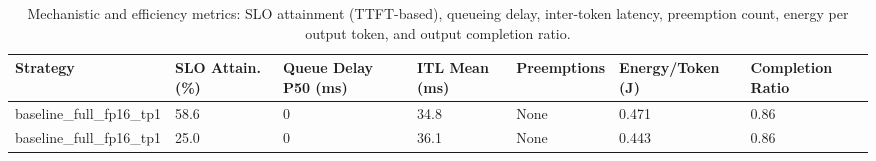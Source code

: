 \begin{table}
\caption{Mechanistic and efficiency metrics: SLO attainment (TTFT-based), queueing delay, inter-token latency, preemption count, energy per output token, and output completion ratio.}
\label{tab:efficiency}
\begin{tabular}{lllllll}
\toprule
Strategy & SLO Attain. (\%) & Queue Delay P50 (ms) & ITL Mean (ms) & Preemptions & Energy/Token (J) & Completion Ratio \\
\midrule
baseline\_full\_fp16\_tp1 & 58.6 & 0 & 34.8 & None & 0.471 & 0.86 \\
baseline\_full\_fp16\_tp1 & 25.0 & 0 & 36.1 & None & 0.443 & 0.86 \\
\bottomrule
\end{tabular}
\end{table}
